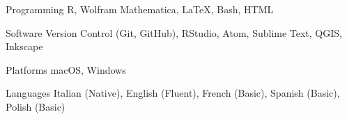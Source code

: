 

\begin{cvskills}

  \cvskill
    {Programming} %
    {R, Wolfram Mathematica, LaTeX, Bash, HTML} %

  \cvskill
    {Software} %
    {Version Control (Git, GitHub), RStudio, Atom, Sublime Text, QGIS, Inkscape} %

  \cvskill
    {Platforms} %
    {macOS, Windows} %

  \cvskill
    {Languages} %
    {Italian (Native), English (Fluent), French (Basic), Spanish (Basic), Polish (Basic)} %

\end{cvskills}
